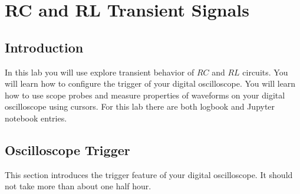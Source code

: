 \chapter{RC and RL Transient Signals}

\section{Introduction}

In this lab you will use explore transient behavior of $RC$ and $RL$
circuits.  You will learn how to configure the trigger of your digital
oscilloscope.  You will learn how to use scope probes and measure
properties of waveforms on your digital oscilloscope using cursors.
For this lab there are both logbook and Jupyter notebook entries.

\section{Oscilloscope Trigger}

This section introduces the trigger feature of your digital
oscilloscope.  It should not take more than about one half hour.

